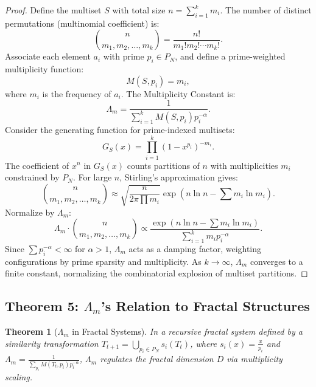 \documentclass{article}
\theoremstyle{plain}
\newtheorem{theorem}{Theorem}
\begin{document}
\begin{proof}
Define the multiset \( S \) with total size \( n = \sum_{i=1}^k m_i \). The number of distinct permutations (multinomial coefficient) is:
\[
\binom{n}{m_1, m_2, \ldots, m_k} = \frac{n!}{m_1! m_2! \cdots m_k!}.
\]
Associate each element \( a_i \) with prime \( p_i \in P_N \), and define a prime-weighted multiplicity function:
\[
M(S, p_i) = m_i,
\]
where \( m_i \) is the frequency of \( a_i \). The Multiplicity Constant is:
\[
\Lambda_m = \frac{1}{\sum_{i=1}^k M(S, p_i) p_i^{-\alpha}}.
\]
Consider the generating function for prime-indexed multisets:
\[
G_S(x) = \prod_{i=1}^k \left( 1 - x^{p_i} \right)^{-m_i}.
\]
The coefficient of \( x^n \) in \( G_S(x) \) counts partitions of \( n \) with multiplicities \( m_i \) constrained by \( P_N \). For large \( n \), Stirling’s approximation gives:
\[
\binom{n}{m_1, m_2, \ldots, m_k} \approx \sqrt{\frac{n}{2\pi \prod m_i}} \exp\left( n \ln n - \sum m_i \ln m_i \right).
\]
Normalize by \(\Lambda_m\):
\[
\Lambda_m \cdot \binom{n}{m_1, m_2, \ldots, m_k} \propto \frac{\exp\left( n \ln n - \sum m_i \ln m_i \right)}{\sum_{i=1}^k m_i p_i^{-\alpha}}.
\]
Since \(\sum p_i^{-\alpha} < \infty\) for \(\alpha > 1\), \(\Lambda_m\) acts as a damping factor, weighting configurations by prime sparsity and multiplicity. As \( k \to \infty \), \(\Lambda_m\) converges to a finite constant, normalizing the combinatorial explosion of multiset partitions.
\end{proof}

\subsection{Theorem 5: \(\Lambda_m\)'s Relation to Fractal Structures}
\begin{theorem}[\(\Lambda_m\) in Fractal Systems]
In a recursive fractal system defined by a similarity transformation \( T_{t+1} = \bigcup_{p_i \in P_N} s_i(T_t) \), where \( s_i(x) = \frac{x}{p_i} \) and \(\Lambda_m = \frac{1}{\sum_{p_i} M(T_t, p_i) p_i^{-\alpha}}\), \(\Lambda_m\) regulates the fractal dimension \( D \) via multiplicity scaling.
\end{theorem}
\end{document}
